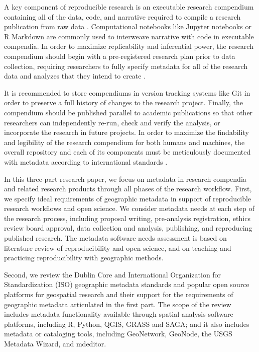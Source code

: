 \documentclass{isprs} %
\begin{document}
A key component of reproducible research is an executable research compendium containing all of the data, code, and narrative required to compile a research publication from raw data \citep{Nust2021}.
Computational notebooks like Jupyter notebooks or R Markdown are commonly used to interweave narrative with code in executable compendia.
In order to maximize replicability and inferential power, the research compendium should begin with a pre-registered research plan prior to data collection, requiring researchers to fully specify metadata for all of the research data and analyzes that they intend to create \citep{Nosek2018}.

It is recommended to store compendiums in version tracking systems like Git in order to preserve a full history of changes to the research project.
Finally, the compendium should be published parallel to academic publications so that other researchers can independently re-run, check and verify the analysis, or incorporate the research in future projects.
In order to maximize the findability and legibility of the research compendium for both humans and machines, the overall repository and each of its components must be meticulously documented with metadata according to international standards \citep{Wilkinson2016,Wilson2021}.

In this three-part research paper, we focus on metadata in research compendia and related research products through all phases of the research workflow.
First, we specify ideal requirements of geographic metadata in support of reproducible research workflows and open science.
We consider metadata needs at each step of the research process, including proposal writing, pre-analysis registration, ethics review board approval, data collection and analysis, publishing, and reproducing published research.
The metadata software needs assessment is based on literature review of reproducibility and open science, and on teaching and practicing reproducibility with geographic methods.

Second, we review the Dublin Core and International Organization for Standardization (ISO) geographic metadata standards and popular open source platforms for geospatial research and their support for the requirements of geographic metadata articulated in the first part.
The scope of the review includes metadata functionality available through spatial analysis software platforms, including R, Python, QGIS, GRASS and SAGA; and it also includes metadata or cataloging tools, including GeoNetwork, GeoNode, the USGS Metadata Wizard, and mdeditor.
\end{document}

